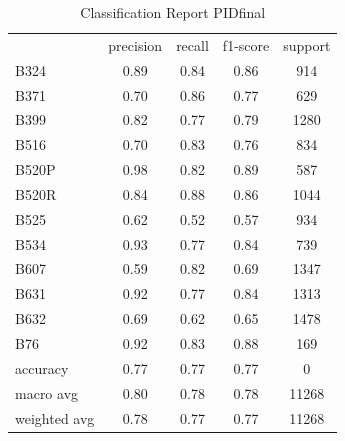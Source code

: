 \begin{table}[htbp]
\centering
\caption{Classification Report PIDfinal}
\label{tab:classificationreport.PIDfinal}
\begin{tabular}{lcccc}
 & precision & recall & f1-score & support \\
B324 & 0.89 & 0.84 & 0.86 & 914 \\
B371 & 0.70 & 0.86 & 0.77 & 629 \\
B399 & 0.82 & 0.77 & 0.79 & 1280 \\
B516 & 0.70 & 0.83 & 0.76 & 834 \\
B520P & 0.98 & 0.82 & 0.89 & 587 \\
B520R & 0.84 & 0.88 & 0.86 & 1044 \\
B525 & 0.62 & 0.52 & 0.57 & 934 \\
B534 & 0.93 & 0.77 & 0.84 & 739 \\
B607 & 0.59 & 0.82 & 0.69 & 1347 \\
B631 & 0.92 & 0.77 & 0.84 & 1313 \\
B632 & 0.69 & 0.62 & 0.65 & 1478 \\
B76 & 0.92 & 0.83 & 0.88 & 169 \\
accuracy & 0.77 & 0.77 & 0.77 & 0 \\
macro avg & 0.80 & 0.78 & 0.78 & 11268 \\
weighted avg & 0.78 & 0.77 & 0.77 & 11268 \\
\end{tabular}
\end{table}

